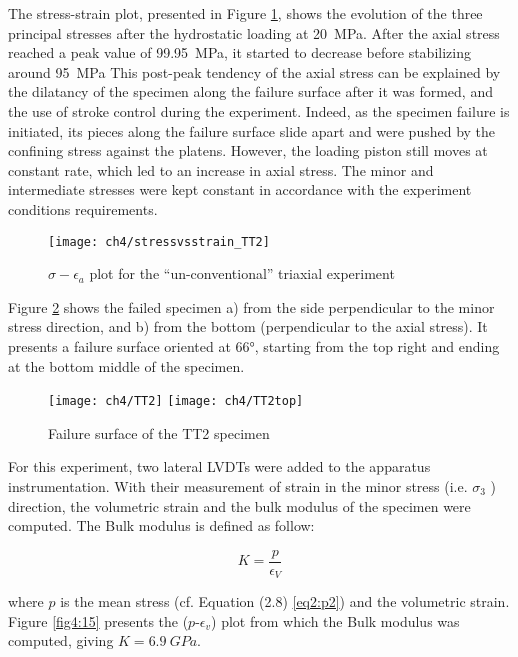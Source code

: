 The stress-strain plot, presented in Figure \ref{fig4:13}, shows the evolution of the three principal stresses after the hydrostatic loading at \SI{20}{MPa}. After the axial stress reached a peak value of \SI{99.95}{MPa}, it started to decrease before stabilizing around \SI{95}{MPa} This post-peak tendency of the axial stress can be explained by the dilatancy of the specimen along the failure surface after it was formed, and the use of stroke control during the experiment. Indeed, as the specimen failure is initiated, its pieces along the failure surface slide apart and were pushed by the confining stress against the platens. However, the loading piston still moves at constant rate, which led to an increase in axial stress. The minor and intermediate stresses were kept constant in accordance with the experiment conditions requirements.

\begin{figure}[tb]
    \centering
    \texttt{[image: ch4/stressvsstrain\_TT2]}
    \caption{$\sigma - \epsilon_a$ plot for the “un-conventional” triaxial experiment}
    \label{fig4:13}
\end{figure} 

Figure \ref{fig4:14} shows the failed specimen a) from the side perpendicular to the minor stress direction, and b) from the bottom (perpendicular to the axial stress). It presents a failure surface oriented at \ang{66}, starting from the top right and ending at the bottom middle of the specimen. 


\begin{figure}[tb]
    \centering
    \texttt{[image: ch4/TT2]}
    \texttt{[image: ch4/TT2top]}
    \caption{Failure surface of the TT2 specimen}
    \label{fig4:14}
\end{figure} 

For this experiment, two lateral LVDTs were added to the apparatus instrumentation. With their measurement of strain in the minor stress (i.e. $\sigma_3$ ) direction, the volumetric strain and the bulk modulus of the specimen were computed. The Bulk modulus is defined as follow:

\begin{equation}
    K=\frac{p}{\epsilon_V}
\end{equation}

where $p$  is the mean stress (cf. Equation (2.8) \ref{eq2:p2}) and  the volumetric strain. Figure \ref{fig4:15} presents the ($p$-$\epsilon_v$) plot from which the Bulk modulus was computed, giving $K = \SI{6.9}{GPa}$. 

